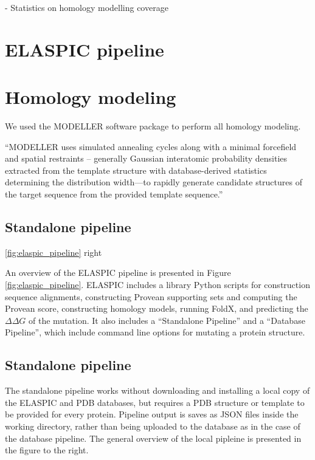 
 \label{chap:implementation}

- Statistics on homology modelling coverage

\section{ELASPIC pipeline}

\section{Homology modeling}

We used the MODELLER software package to perform all homology modeling.

``MODELLER uses simulated annealing cycles along with a minimal forcefield and spatial restraints -- generally Gaussian interatomic probability densities extracted from the template structure with database-derived statistics determining the distribution width—to rapidly generate candidate structures of the target sequence from the provided template sequence.''

\subsection{Standalone pipeline}

\ref{fig:elaspic_pipeline} right

An overview of the ELASPIC pipeline is presented in Figure \ref{fig:elaspic_pipeline}. ELASPIC includes a library Python scripts for construction sequence alignments, constructing Provean supporting sets and computing the Provean score, constructing homology models, running FoldX, and predicting the $\Delta \Delta G$ of the mutation. It also includes a ``Standalone Pipeline'' and a ``Database Pipeline'', which include command line options for mutating a protein structure.


\subsection{Standalone pipeline}

The standalone pipeline works without downloading and installing a local copy of the ELASPIC and PDB databases, but requires a PDB structure or template to be provided for every protein. Pipeline output is saves as JSON files inside the working directory, rather than being uploaded to the database as in the case of the database pipeline. The general overview of the local pipleine is presented in the figure to the right.

